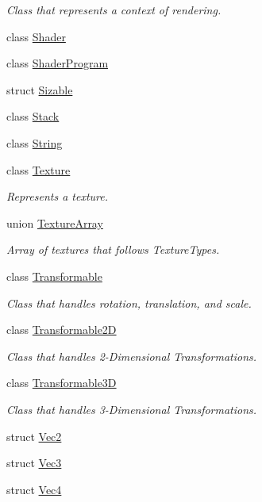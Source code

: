 \begin{DoxyCompactItemize}
\begin{DoxyCompactList}\small\item\em Class that represents a context of rendering. \end{DoxyCompactList}\item 
class \hyperlink{classpcs_1_1Shader}{Shader}
\item 
class \hyperlink{classpcs_1_1ShaderProgram}{Shader\+Program}
\item 
struct \hyperlink{structpcs_1_1Sizable}{Sizable}
\item 
class \hyperlink{classpcs_1_1Stack}{Stack}
\item 
class \hyperlink{classpcs_1_1String}{String}
\item 
class \hyperlink{classpcs_1_1Texture}{Texture}
\begin{DoxyCompactList}\small\item\em Represents a texture. \end{DoxyCompactList}\item 
union \hyperlink{unionpcs_1_1TextureArray}{Texture\+Array}
\begin{DoxyCompactList}\small\item\em Array of textures that follows Texture\+Types. \end{DoxyCompactList}\item 
class \hyperlink{classpcs_1_1Transformable}{Transformable}
\begin{DoxyCompactList}\small\item\em Class that handles rotation, translation, and scale. \end{DoxyCompactList}\item 
class \hyperlink{classpcs_1_1Transformable2D}{Transformable2D}
\begin{DoxyCompactList}\small\item\em Class that handles 2-\/\+Dimensional Transformations. \end{DoxyCompactList}\item 
class \hyperlink{classpcs_1_1Transformable3D}{Transformable3D}
\begin{DoxyCompactList}\small\item\em Class that handles 3-\/\+Dimensional Transformations. \end{DoxyCompactList}\item 
struct \hyperlink{structpcs_1_1Vec2}{Vec2}
\item 
struct \hyperlink{structpcs_1_1Vec3}{Vec3}
\item 
struct \hyperlink{structpcs_1_1Vec4}{Vec4}

\end{DoxyCompactItemize}
